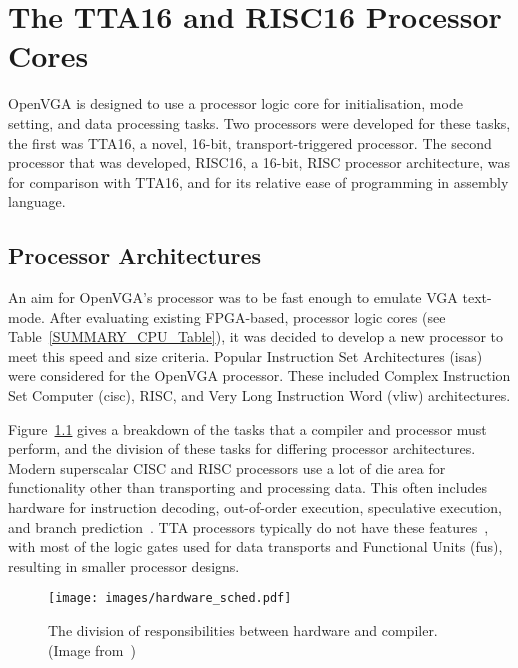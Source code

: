 \chapter{The TTA16 and RISC16 Processor Cores}
\label{CPU}

OpenVGA is designed to use a processor logic core for initialisation, mode
setting, and data processing tasks. Two processors were developed for these
tasks, the first was TTA16, a novel, 16-bit, transport-triggered processor. The
second processor that was developed, RISC16, a 16-bit, RISC processor
architecture, was for comparison with TTA16, and for its relative ease of
programming in assembly language.


\section{Processor Architectures}
An aim for OpenVGA's processor was to be fast enough to emulate VGA text-mode.
After evaluating existing FPGA-based, processor logic cores (see
Table~\ref{SUMMARY_CPU_Table}), it was decided to develop a new processor to meet
this speed and size criteria. Popular Instruction Set
Architectures
(\gls{isa}s) were considered for the OpenVGA processor. These included Complex
Instruction Set Computer (\gls{cisc}), RISC, and Very Long Instruction Word (\gls{vliw}) architectures.

Figure~\ref{CPU_Sched} gives a breakdown of the tasks that a compiler and
processor must perform, and the division of these tasks for differing processor
architectures. Modern superscalar CISC and RISC processors use a lot of die area
for functionality other than transporting and processing data. This often
includes hardware for instruction decoding, out-of-order execution, speculative
execution, and branch prediction~\cite{parhami2005cam}. TTA processors typically
do not have these features~\cite{corporaal:tta}, with most of the logic gates
used for data transports and Functional Units (\gls{fu}s), resulting in smaller processor designs.

\begin{figure}[h!]
\begin{center}
\texttt{[image: images/hardware\_sched.pdf]}
\caption[The division of responsibilities between hardware and compiler]{The
division of responsibilities between hardware and compiler. (Image
from~\cite{corporaal1999tmi})}
\label{CPU_Sched}
\end{center}
\end{figure}

